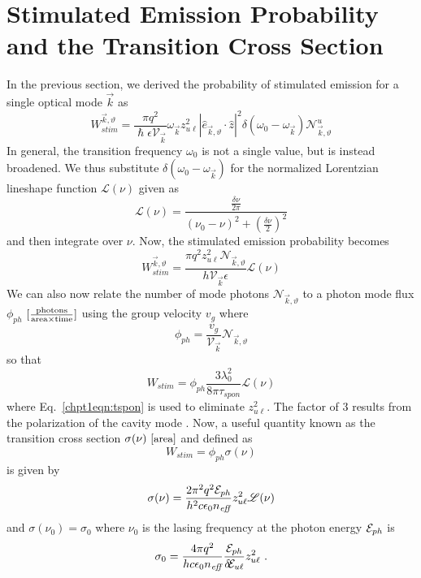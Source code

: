 {\section{Stimulated Emission Probability and the Transition Cross Section}
In the previous section, we derived the probability of stimulated emission for a single optical mode $\vec{k}$ as
\begin{equation}
W_\textit{stim}^{\vec{k},\vartheta} = \frac{\pi q^2}{\hslash \epsilon \mathcal{V}_{\vec{k}}} \omega_{\vec{k}}
z_{u\ell}^2
|\hat{e}_{\vec{k},\vartheta} \cdot \hat{z} |^2  \delta(\omega_0-\omega_{\vec{k}}) \mathcal{N}_{\vec{k},\vartheta}^u
\end{equation}
In general, the transition frequency $\omega_0$ is not a single value, but is instead broadened.  We thus substitute $\delta(\omega_0-\omega_{\vec{k}})$ for the normalized Lorentzian lineshape function $\mathscr{L}(\nu)$ given as
\begin{equation}
\mathscr{L}(\nu)=\frac{\frac{\delta\!\nu}{2\pi}}{(\nu_0-\nu)^2+\left(\frac{\delta\!\nu}{2} \right)^2} %
\end{equation}
and then integrate over $\nu$.  Now, the stimulated emission probability becomes \cite{Yariv:book:1989}
\begin{equation}
W_\textit{stim}^{\vec{k},\vartheta}=\frac{\pi q^2 z_{u\ell}^2 \mathcal{N}_{\vec{k},\vartheta}}{h \mathcal{V}_{\vec{k}} \epsilon} \mathscr{L}(\nu)
\end{equation}
We can also now relate the number of mode photons $\mathcal{N}_{\vec{k},\vartheta}$ to a photon mode flux $\phi_{ph}$ $[\frac{\textnormal{photons}}{\textnormal{area}\times\textnormal{time}}]$ using the group velocity $v_g$ where
\begin{equation}
\phi_{ph} = \frac{v_g}{\mathcal{V}_{\vec{k}}} \mathcal{N}_{\vec{k},\vartheta}
\end{equation}
so that \cite{Yariv:book:1989}
\begin{equation}
W_\textit{stim} = \phi_{ph} \frac{3 \lambda_0^2}{8 \pi \tau_\textit{spon}} \mathscr{L}(\nu)
\end{equation}
where Eq.~\eqref{chpt1eqn:tspon} is used to eliminate $z_{u\ell}^2$.  The factor of 3 results from the polarization of the cavity mode \cite{Siegman:book:1986}.  Now, a useful quantity known as the transition cross section $\sigma(\nu)~[\small{\textnormal{area}}]$ and defined as \cite{SalehTeich:book:1991}
\begin{equation}
W_\textit{stim}=\phi_{ph} \sigma(\nu)
\end{equation}
is given by
\begin{equation}
\sigma(\nu) = \frac{2 \pi^2 q^2 \EE_{ph}}{h^2 c \epsilon_0 n_\textit{eff}} z_{u\ell}^2 \mathscr{L}(\nu)
\end{equation}
and $\sigma(\nu_0)=\sigma_0$ where $\nu_0$ is the lasing frequency at the photon energy $\EE_{ph}$ is
\begin{equation}
\label{chpt1eqn:transition_crosssection}
\sigma_0 = \frac{4 \pi q^2}{h c \epsilon_0 n_\textit{eff}} \frac{\EE_{ph}}{\delta\!\EE_{u\ell}} z_{u\ell}^2 \tn{~.}
\end{equation}

}
